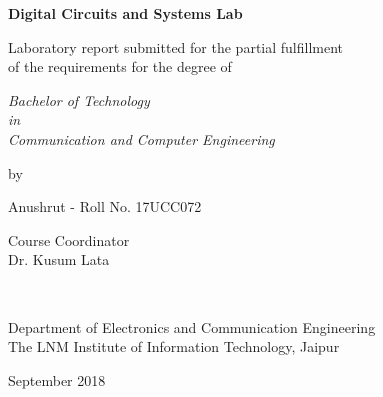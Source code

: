 \thispagestyle{empty}
\begin{center}
{\huge \bf Digital Circuits and Systems Lab  }

\vspace*{1.75cm}
{\large Laboratory report submitted for the  partial fulfillment\\}
{\large  of the requirements for the degree of \\}

\vspace*{1cm}
{\it {\large Bachelor of Technology} \\
{\large in\\}
{\large Communication and Computer Engineering \\}}

\vspace*{1cm}
{\large by}

\vspace*{1cm}
{\large Anushrut - Roll No.  17UCC072\\}


\vspace*{5mm}
{\large Course Coordinator \\}
{\large Dr. Kusum Lata \\}

\vspace*{1.0cm}
{\\}

\vspace*{2.0cm}
{\large Department of Electronics and Communication Engineering \\}
{\large The LNM Institute of Information Technology, Jaipur\\}

\vspace*{1.0cm}
{\large September 2018\\}
\end{center}

